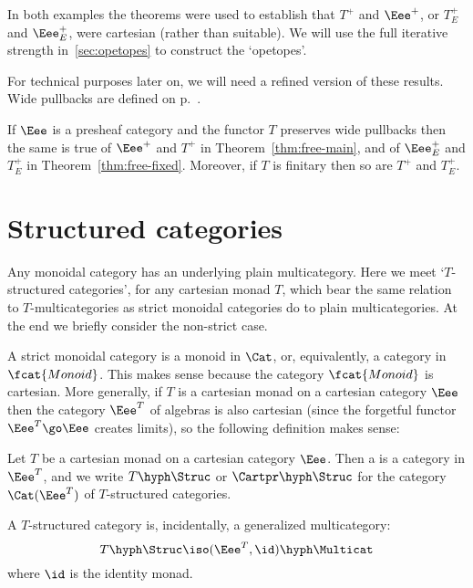 In both examples the theorems were used to establish that $T^+$ and
$\Eee^+$, or $T^+_E$ and $\Eee^+_E$, were cartesian (rather than suitable).
We will use the full iterative strength in~\ref{sec:opetopes} to construct
the `opetopes'.

For technical purposes later on, we will need a refined version of these
results.  Wide pullbacks are defined on p.~\pageref{p:defn-wide-pb}.
%
\begin{propn}	
If $\Eee$ is a presheaf category and the functor $T$ preserves wide
pullbacks then the same is true of $\Eee^+$ and $T^+$ in
Theorem~\ref{thm:free-main}, and of $\Eee^+_E$ and $T^+_E$ in
Theorem~\ref{thm:free-fixed}.  Moreover, if $T$ is finitary then so are
$T^+$ and $T^+_E$.
\end{propn}%
%
%




\section{Structured categories}
%
%
%
%
%
%
%


Any monoidal category has an underlying plain multicategory.  Here we
meet `$T$-structured categories', for any cartesian monad $T$, which
bear the same relation to $T$-multicategories as strict monoidal categories
do to plain multicategories.  At the end we briefly consider the non-strict
case.

A strict monoidal category is a monoid in $\Cat$, or, equivalently, a
category in $\fcat{Monoid}$.  This makes sense because the category
$\fcat{Monoid}$ is cartesian.  More generally, if $T$ is a cartesian monad
on a cartesian category $\Eee$ then the category $\Eee^T$ of algebras is
also cartesian (since the forgetful functor $\Eee^T \go \Eee$ creates
limits), so the following definition makes sense:
%
\begin{defn}
Let $T$ be a cartesian monad on a cartesian category $\Eee$.  Then a
%
%
%
is a category in $\Eee^T$, and we write
$T\hyph\Struc$%
% 
% 
or $\Cartpr\hyph\Struc$ for the category $\Cat(\Eee^T)$ of
$T$-structured categories.
\end{defn}
%
A $T$-structured category is, incidentally, a generalized multicategory:
\[
T\hyph\Struc \iso (\Eee^T, \id)\hyph\Multicat
\]
where $\id$ is the identity monad.

